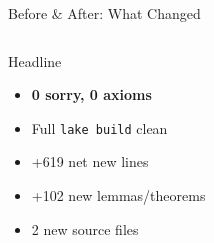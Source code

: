 \documentclass[aspectratio=169,10pt]{beamer}
\begin{document}
\begin{frame}{Before \& After: What Changed}
\begin{columns}[T]
        \begin{block}{\small Headline}
            {\small
            \begin{itemize}\itemsep0.15em
                \item[\textcolor{leangreen}{\checkmark}] \textbf{0 sorry, 0 axioms}
                \item[\textcolor{leangreen}{\checkmark}] Full \texttt{lake build} clean
                \item[\textcolor{leangreen}{\checkmark}] +619 net new lines
                \item[\textcolor{leangreen}{\checkmark}] +102 new lemmas/theorems
                \item[\textcolor{leangreen}{\checkmark}] 2 new source files
            \end{itemize}
            }
        \end{block}

        \vspace{0.2em}
    \end{columns}
\end{frame}
\end{document}
